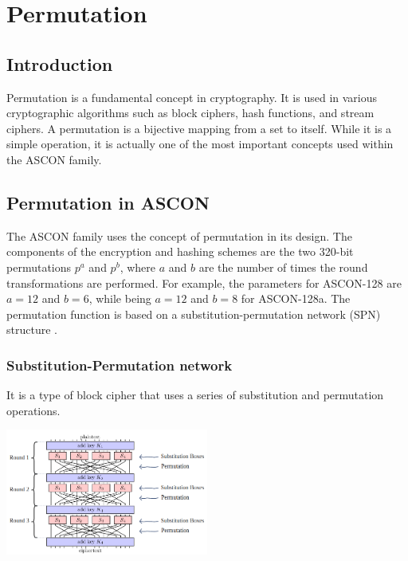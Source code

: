
\section{Permutation}
\subsection{Introduction}

Permutation is a fundamental concept in cryptography. It is used in various cryptographic algorithms such as block ciphers, hash functions, and stream ciphers. A permutation is a bijective mapping from a set to itself. While it is a simple operation, it is actually one of the most important concepts used within the ASCON family. \par


\subsection{Permutation in ASCON}
The ASCON family uses the concept of permutation in its design. The components of the encryption and hashing schemes are the two 320-bit permutations $p^a$ and $p^b$, where $a$ and $b$ are the number of times the round transformations are performed. For example, the parameters for ASCON-128 are $a = 12$ and $b = 6$, while being $a = 12$ and $b = 8$ for ASCON-128a. The permutation function is based on a substitution-permutation network (SPN) structure \cite{DBLP:journals/joc/DobraunigEMS21, ascon_specification}. \par

\subsubsection{Substitution-Permutation network}

It is a type of block cipher that uses a series of substitution and permutation operations.

\begin{center}
  \centering 
  \includegraphics[width=0.5\textwidth]{images/spn.png}
  \label{fig:spn}
\end{center}


